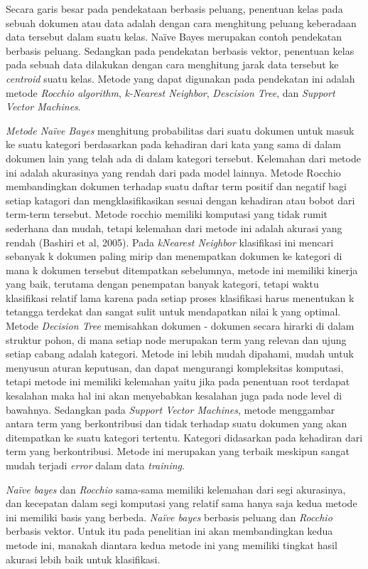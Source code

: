 Secara garis besar pada pendekataan berbasis peluang, penentuan kelas pada sebuah dokumen atau data adalah dengan cara menghitung peluang keberadaan data tersebut dalam suatu kelas. Naïve Bayes merupakan contoh pendekatan berbasis peluang. Sedangkan pada pendekatan berbasis vektor, penentuan kelas pada sebuah data dilakukan dengan cara menghitung jarak data tersebut ke \textit{centroid} suatu kelas. Metode yang dapat digunakan pada pendekatan ini adalah metode \textit{Rocchio algorithm}, \textit{k-Nearest Neighbor}, \textit{Descision Tree}, dan \textit{Support Vector Machines}. 

\textit{Metode Naïve Bayes} menghitung probabilitas dari suatu dokumen untuk masuk ke suatu kategori berdasarkan pada kehadiran dari kata yang sama di dalam dokumen lain yang telah ada di dalam kategori tersebut. Kelemahan dari metode ini adalah akurasinya yang rendah dari pada model lainnya. Metode Rocchio membandingkan dokumen terhadap suatu daftar term positif dan negatif bagi setiap katagori dan mengklasifikasikan sesuai dengan kehadiran atau bobot dari term-term tersebut. Metode rocchio memiliki komputasi yang tidak rumit sederhana dan mudah, tetapi kelemahan dari metode ini adalah akurasi yang rendah (Bashiri et al, 2005). Pada \textit{kNearest Neighbor} klasifikasi ini mencari sebanyak k dokumen paling mirip dan menempatkan dokumen ke kategori di mana k dokumen tersebut ditempatkan sebelumnya, metode ini memiliki kinerja yang baik, terutama dengan penempatan banyak kategori, tetapi waktu klasifikasi relatif lama karena pada setiap proses klasifikasi harus menentukan k tetangga terdekat dan sangat sulit untuk mendapatkan nilai k yang optimal. Metode \textit{Decision Tree} memisahkan dokumen - dokumen secara hirarki di dalam struktur pohon, di mana setiap node merupakan term yang relevan dan ujung setiap cabang adalah kategori. Metode ini lebih mudah dipahami, mudah untuk menyusun aturan keputusan, dan dapat mengurangi kompleksitas komputasi, tetapi metode ini memiliki kelemahan yaitu jika pada penentuan root terdapat kesalahan maka hal ini akan menyebabkan kesalahan juga pada node level di bawahnya. Sedangkan pada \textit{Support Vector Machines}, metode menggambar antara term yang berkontribusi dan tidak terhadap suatu dokumen yang akan ditempatkan ke suatu kategori tertentu. Kategori didasarkan pada kehadiran dari term yang berkontribusi. Metode ini merupakan yang terbaik meskipun sangat mudah terjadi \textit{error} dalam data \textit{ training}.

\textit{Naïve bayes} dan \textit{Rocchio} sama-sama memiliki kelemahan dari segi akurasinya, dan kecepatan dalam segi komputasi yang relatif sama hanya saja kedua metode ini memiliki basis yang berbeda. \textit{Naïve bayes} berbasis peluang dan \textit{Rocchio} berbasis vektor. Untuk itu pada penelitian ini akan membandingkan kedua metode ini, manakah diantara kedua metode ini yang memiliki tingkat hasil akurasi lebih baik untuk klasifikasi.


